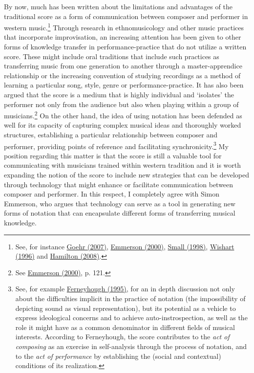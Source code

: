By now, much has been written about the limitations and advantages of the traditional score as a form of communication between composer and performer in western music.\footnote{See, for instance \hyperlink{goer}{Goehr (2007)}, \hyperlink{emmersoncross}{Emmerson (2000)}, \hyperlink{small}{Small (1998)}, \hyperlink{wishart}{Wishart (1996)} and \hyperlink{hamilton}{Hamilton (2008)}.} Through research in \mbox{ethnomusicology} and other music practices that incorporate improvisation, an increasing attention has been given to other forms of knowledge transfer in performance-practice that do not utilize a written score. These might include oral traditions that include such practices as transferring music from one generation to another through a master-apprendice relationship or the increasing convention of studying recordings as a method of learning a particular song, style, genre or performance-practice. It has also been argued that the score is a medium that is highly individual and `isolates' the performer not only from the audience but also when playing within a group of musicians.\footnote{See \hyperlink{emmersoncross}{Emmerson (2000)}, p. 121.} On the other hand, the idea of using notation has been defended as well for its capacity of capturing complex musical ideas and thoroughly worked structures, establishing a particular relationship between composer and performer, providing points of reference and facilitating synchronicity.\footnote{See, for example \hyperlink{ferneyhough}{Ferneyhough (1995)}, for an in depth discussion not only about the difficulties implicit in the practice of notation (the impossibility of depicting sound as visual representation), but its potential as a vehicle to express ideological concerns and to achieve auto-instrospection,  as well as the role it might have as a common denominator in different fields of musical interests. According to Ferneyhough, the score contributes to the \emph{act of composing} as an exercise in self-analysis through the process of notation, and to the \emph{act of performance} by establishing the (social and contextual) conditions of its realization.} My position regarding this matter is that the score is still a valuable tool for communicating with musicians trained within western tradition and it is worth expanding the notion of the score to include new strategies that can be developed through technology that might enhance or facilitate communication between composer and performer. In this respect, I completely agree with Simon Emmerson, who argues that technology can serve as a tool in generating new forms of notation that can encapsulate different forms of transferring musical knowledge. 
